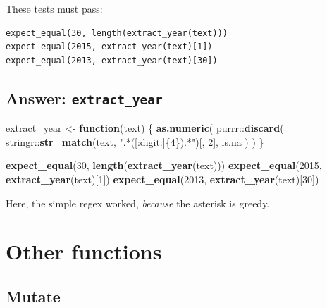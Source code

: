 \documentclass[]{book}
\newenvironment{Shaded}{}{}
\newcommand{\ControlFlowTok}[1]{\textcolor[rgb]{0.00,0.44,0.13}{\textbf{#1}}}
\newcommand{\DecValTok}[1]{\textcolor[rgb]{0.25,0.63,0.44}{#1}}
\newcommand{\KeywordTok}[1]{\textcolor[rgb]{0.00,0.44,0.13}{\textbf{#1}}}
\newcommand{\NormalTok}[1]{#1}
\newcommand{\OperatorTok}[1]{\textcolor[rgb]{0.40,0.40,0.40}{#1}}
\newcommand{\StringTok}[1]{\textcolor[rgb]{0.25,0.44,0.63}{#1}}
\begin{document}
These tests must pass:

\begin{verbatim}
expect_equal(30, length(extract_year(text)))
expect_equal(2015, extract_year(text)[1])
expect_equal(2013, extract_year(text)[30])
\end{verbatim}

\hypertarget{answer-extract_year}{%
\section{\texorpdfstring{Answer: \texttt{extract\_year}}{Answer: extract\_year}}\label{answer-extract_year}}

\begin{Shaded}
\begin{Highlighting}[]
\NormalTok{extract_year <-}\StringTok{ }\ControlFlowTok{function}\NormalTok{(text) \{}
  \KeywordTok{as.numeric}\NormalTok{(}
\NormalTok{    purrr}\OperatorTok{::}\KeywordTok{discard}\NormalTok{(}
\NormalTok{      stringr}\OperatorTok{::}\KeywordTok{str_match}\NormalTok{(text, }\StringTok{".*([:digit:]\{4\}).*"}\NormalTok{)[, }\DecValTok{2}\NormalTok{],}
\NormalTok{      is.na}
\NormalTok{    )}
\NormalTok{  )}
\NormalTok{\}}
\end{Highlighting}
\end{Shaded}

\begin{Shaded}
\begin{Highlighting}[]
\KeywordTok{expect_equal}\NormalTok{(}\DecValTok{30}\NormalTok{, }\KeywordTok{length}\NormalTok{(}\KeywordTok{extract_year}\NormalTok{(text)))}
\KeywordTok{expect_equal}\NormalTok{(}\DecValTok{2015}\NormalTok{, }\KeywordTok{extract_year}\NormalTok{(text)[}\DecValTok{1}\NormalTok{])}
\KeywordTok{expect_equal}\NormalTok{(}\DecValTok{2013}\NormalTok{, }\KeywordTok{extract_year}\NormalTok{(text)[}\DecValTok{30}\NormalTok{])}
\end{Highlighting}
\end{Shaded}

Here, the simple regex worked, \emph{because} the asterisk is greedy.

\hypertarget{other-functions}{%
\chapter{Other functions}\label{other-functions}}

\hypertarget{mutate}{%
\section{Mutate}\label{mutate}}
\end{document}
